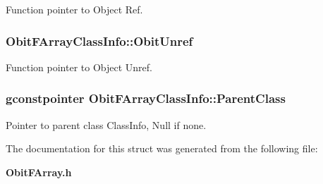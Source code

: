 Function pointer to Object Ref. 

\subsubsection{ {\bf Obit\-FArray\-Class\-Info::Obit\-Unref}}\label{structObitFArrayClassInfo_o11}


Function pointer to Object Unref. 

\subsubsection{\setlength{\rightskip}{0pt plus 5cm}gconstpointer {\bf Obit\-FArray\-Class\-Info::Parent\-Class}}\label{structObitFArrayClassInfo_o3}


Pointer to parent class Class\-Info, Null if none. 



The documentation for this struct was generated from the following file:\begin{CompactItemize}
\item 
{\bf Obit\-FArray.h}\end{CompactItemize}
